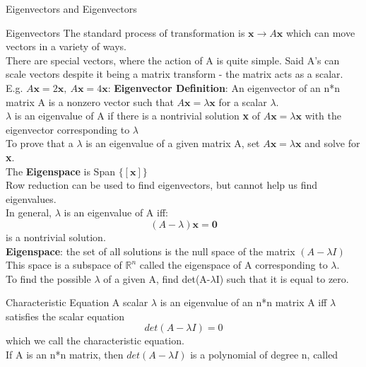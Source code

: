 \documentclass[a4paper, 12pt]{article}
\begin{document}
\begin{section}{Eigenvectors and Eigenvectors}
\begin{subsection}
\begin{enumerate}
\end{enumerate}
\end{subsection}
\begin{subsection}{Eigenvectors}
The standard process of transformation is $\textbf{x} \to A\textbf{x}$ which can 
move vectors in a variety of ways.\\ 
There are special vectors, where the action of A is quite simple. Said A's can scale
vectors despite it being a matrix transform - the matrix acts as a scalar. \\
E.g. $A\textbf{x}=2\textbf{x},~A\textbf{x}=4\textbf{x}$:
\textbf{Eigenvector Definition}: An eigenvector of an n*n matrix A is a nonzero
vector such that $A\textbf{x}=\lambda \textbf{x}$ for a scalar $\lambda$.\\
$\lambda$ is an eigenvalue of A if there is a nontrivial solution \textbf{x} of 
$A\textbf{x}=\lambda \textbf{x}$ with the eigenvector corresponding to $\lambda$\\
To prove that a $\lambda$ is an eigenvalue of a given matrix A, set $A\textbf{x}=
\lambda\textbf{x}$ and solve for \textbf{x}.\\
The \textbf{Eigenspace} is Span $\{[\textbf{x}]\}$\\
Row reduction can be used to find eigenvectors, but cannot help us find eigenvalues.
\\ In general, $\lambda$ is an eigenvalue of A iff:
\begin{equation} \label{Eigenvalues}
	(A-\lambda )\textbf{x}=\textbf{0}
\end{equation}
is a nontrivial solution. \\
\textbf{Eigenspace}: the set of all solutions is the null space of the matrix 
$(A-\lambda I)$\\
This space is a subspace of $\mathbb{R}^{n}$ called the eigenspace of A corresponding
to $\lambda$. \\
To find the possible $\lambda$ of a given A, find det(A-$\lambda$I) such that it is
equal to zero.\\
\end{subsection}
\begin{subsection}{Characteristic Equation}
A scalar $\lambda$ is an eigenvalue of an n*n matrix A iff $\lambda$ satisfies the
scalar equation 
\begin{equation}
det(A-\lambda I)=0
\end{equation}
which we call the characteristic equation.\\
If A is an n*n matrix, then $det(A-\lambda I)$ is a polynomial of degree n, called

\end{subsection}
\end{section}
\end{document}
